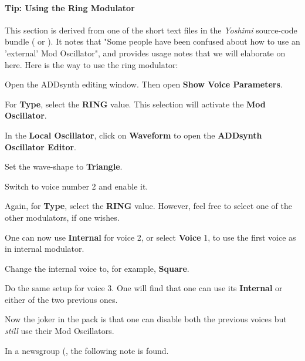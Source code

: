 \paragraph{Tip: Using the Ring Modulator}
\label{paragraph:tips_using_the_ring_modulator}

   This section is derived from one of the short text files in the
   \textsl{Yoshimi} source-code bundle (\cite{yoshimi} or \cite{yoshimi2}).
   It notes that "Some people have
   been confused about how to use an 'external' Mod Oscillator", and
   provides usage notes that we will elaborate on here.  Here is the way to
   use the ring modulator:

   \begin{enumber}
      \item Open the ADDsynth editing window.  Then open
         \textbf{Show Voice Parameters}.
      \item For \textbf{Type}, select the \textbf{RING} value.  This
         selection will activate the \textbf{Mod Oscillator}.
      \item In the \textbf{Local Oscillator}, click on \textbf{Waveform} to open
         the \textbf{ADDsynth Oscillator Editor}.
      \item Set the wave-shape to \textbf{Triangle}.
      \item Switch to voice number 2 and enable it.
      \item Again, for \textbf{Type}, select the \textbf{RING} value.
         However, feel free to select one of the other modulators, if one
         wishes.
      \item One can now use \textbf{Internal} for voice 2, or select
         \textbf{Voice} 1, to use the first voice as in internal modulator.
      \item Change the internal voice to, for example, \textbf{Square}.
      \item Do the same setup for voice 3.
         One will find that one can use its \textbf{Internal} or
         either of the two previous ones.
   \end{enumber}

   Now the joker in the pack is that one can disable both the previous
   voices but \textsl{still} use their Mod Oscillators.

   In a newsgroup (\cite{ringmodulator}, the following note is found.

